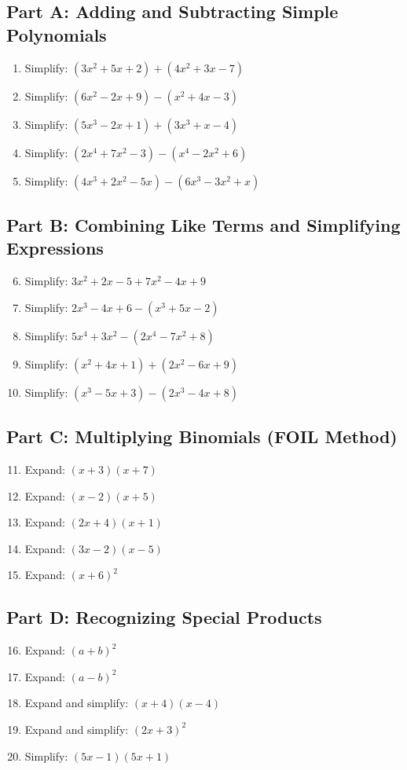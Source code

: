 \documentclass[14pt]{extarticle}
\begin{document}
\subsection*{Part A: Adding and Subtracting Simple Polynomials}
\begin{enumerate}
  \item Simplify: \((3x^2 + 5x + 2) + (4x^2 + 3x - 7)\)
  \item Simplify: \((6x^2 - 2x + 9) - (x^2 + 4x - 3)\)
  \item Simplify: \((5x^3 - 2x + 1) + (3x^3 + x - 4)\)
  \item Simplify: \((2x^4 + 7x^2 - 3) - (x^4 - 2x^2 + 6)\)
  \item Simplify: \((4x^3 + 2x^2 - 5x) - (6x^3 - 3x^2 + x)\)
\end{enumerate}

\subsection*{Part B: Combining Like Terms and Simplifying Expressions}
\begin{enumerate}
  \setcounter{enumi}{5}
  \item Simplify: \(3x^2 + 2x - 5 + 7x^2 - 4x + 9\)
  \item Simplify: \(2x^3 - 4x + 6 - (x^3 + 5x - 2)\)
  \item Simplify: \(5x^4 + 3x^2 - (2x^4 - 7x^2 + 8)\)
  \item Simplify: \((x^2 + 4x + 1) + (2x^2 - 6x + 9)\)
  \item Simplify: \((x^3 - 5x + 3) - (2x^3 - 4x + 8)\)
\end{enumerate}

\subsection*{Part C: Multiplying Binomials (FOIL Method)}
\begin{enumerate}
  \setcounter{enumi}{10}
  \item Expand: \((x + 3)(x + 7)\)
  \item Expand: \((x - 2)(x + 5)\)
  \item Expand: \((2x + 4)(x + 1)\)
  \item Expand: \((3x - 2)(x - 5)\)
  \item Expand: \((x + 6)^2\)
\end{enumerate}

\subsection*{Part D: Recognizing Special Products}
\begin{enumerate}
  \setcounter{enumi}{15}
  \item Expand: \((a + b)^2\)
  \item Expand: \((a - b)^2\)
  \item Expand and simplify: \((x + 4)(x - 4)\)
  \item Expand and simplify: \((2x + 3)^2\)
  \item Simplify: \((5x - 1)(5x + 1)\)
\end{enumerate}
\end{document}
